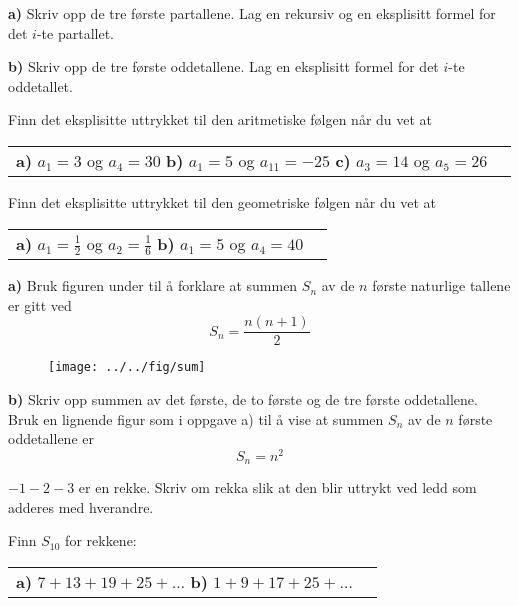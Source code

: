 




\opgt
\setcounter{section}{1}	

\textbf{a)} Skriv opp de tre første partallene. Lag en rekursiv og en eksplisitt formel for det $ i $-te partallet.\os
	
\textbf{b)} Skriv opp de tre første oddetallene. Lag en eksplisitt formel for det $ i $-te oddetallet. 

Finn det eksplisitte uttrykket til  den aritmetiske følgen når du vet at\os
\begin{tabular}{@{}l l}	
	\textbf{a)} $ a_1=3 $ og $ a_4 = 30 $ \os 
	\textbf{b)} $ a_1 = 5 $ og $ a_{11} = -25 $ \os
	\textbf{c)} $ a_3 =14 $ og $ a_5=26 $ 
\end{tabular}\os

Finn det eksplisitte uttrykket til den geometriske følgen når du vet at\os
\begin{tabular}{@{}l l}	
	\textbf{a)} $ a_1=\frac{1}{2} $ og $ a_2 = \frac{1}{6} $ \os 
	\textbf{b)} $ a_1 = 5 $ og $ a_4 = 40 $
\end{tabular} \os

\begin{comment}
	\op
Bruk formelen fra oppgave \textsl{\ref{sumkvad}a} og det eksplisitte uttrykket for en aritmetisk følge til å forklare at summen av en aritmetisk rekke kan skrives som:
\[na_1 +\frac{dn(n-1)}{2} \]


\op
a) Bruk (\ref{sumg}) og vis at summen $ S_\infty $ når $ n\to\infty $ blir:
\[ S_\infty=a_1\frac{1}{1-k} \]
for $ |k|<1 $.
\end{comment}
\nes

\textbf{a)} Bruk figuren under til å forklare at summen $ S_n $ av de $ n $ første naturlige tallene er gitt ved
\[S_n=\frac{n(n+1)}{2}  \]

\begin{figure}
	\centering
	\texttt{[image: ../../fig/sum]}
\end{figure}\vs
\textbf{b)} Skriv opp summen av det første, de to første og de tre første  oddetallene. Bruk en lignende figur som i oppgave a) til å vise at summen $ S_n $ av de $ n $ første oddetallene er
\[ S_n = n^2 \] 

$ -1-2-3 $ er en rekke. Skriv om rekka slik at den blir uttrykt ved ledd som adderes med hverandre. 

Finn $ S_{10} $ for rekkene:\os
\begin{tabular}{@{}l l}	
	\textbf{a)} $ 7+13+19+25+\ldots $\quad
	\textbf{b)} $ 1+9+17+25+\ldots $
\end{tabular} \os

